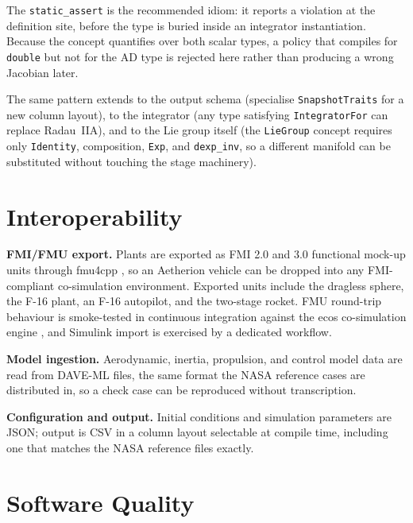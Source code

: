 \documentclass[a4paper,10pt]{article}
\newcommand{\code}[1]{\texttt{\small #1}}
\theoremstyle{definition}
\begin{document}
The \code{static\_assert} is the recommended idiom: it reports a violation at
the definition site, before the type is buried inside an integrator
instantiation.  Because the concept quantifies over both scalar types, a policy
that compiles for \code{double} but not for the AD type is rejected here rather
than producing a wrong Jacobian later.

The same pattern extends to the output schema (specialise
\code{SnapshotTraits} for a new column layout), to the integrator (any type
satisfying \code{IntegratorFor} can replace Radau~IIA), and to the Lie group
itself (the \code{LieGroup} concept requires only \code{Identity}, composition,
\code{Exp}, and \code{dexp\_inv}, so a different manifold can be substituted
without touching the stage machinery).

\section{Interoperability}
\label{sec:interop}

\textbf{FMI/FMU export.}  Plants are exported as FMI 2.0 and 3.0 functional
mock-up units through fmu4cpp \citep{fmu4cpp}, so an Aetherion vehicle can be
dropped into any FMI-compliant co-simulation environment.  Exported units
include the dragless sphere, the F-16 plant, an F-16 autopilot, and the
two-stage rocket.  FMU round-trip behaviour is smoke-tested in continuous
integration against the ecos co-simulation engine \citep{ecos}, and Simulink
import is exercised by a dedicated workflow.

\textbf{Model ingestion.}  Aerodynamic, inertia, propulsion, and control model
data are read from DAVE-ML files, the same format the NASA reference cases are
distributed in, so a check case can be reproduced without transcription.

\textbf{Configuration and output.}  Initial conditions and simulation
parameters are JSON; output is CSV in a column layout selectable at compile
time, including one that matches the NASA reference files exactly.

\section{Software Quality}
\label{sec:quality}
\end{document}
